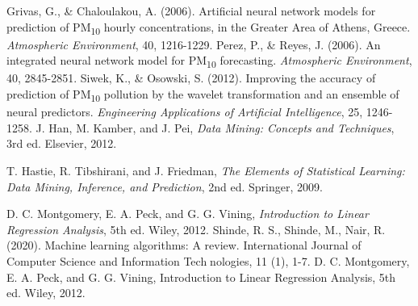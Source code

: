 \documentclass{book}
\numberwithin{equation}{section}
\numberwithin{figure}{section}
\begin{document}
\begin{thebibliography}{99}
    Grivas, G., \& Chaloulakou, A. (2006). Artificial neural network models for prediction of PM\textsubscript{10} hourly concentrations, in the Greater Area of Athens, Greece. \textit{Atmospheric Environment}, 40, 1216-1229.
    Perez, P., \& Reyes, J. (2006). An integrated neural network model for PM\textsubscript{10} forecasting. \textit{Atmospheric Environment}, 40, 2845-2851.
    Siwek, K., \& Osowski, S. (2012). Improving the accuracy of prediction of PM\textsubscript{10} pollution by the wavelet transformation and an ensemble of neural predictors. \textit{Engineering Applications of Artificial Intelligence}, 25, 1246-1258.
    J. Han, M. Kamber, and J. Pei, \textit{Data Mining: Concepts and Techniques}, 3rd ed. Elsevier, 2012.

    T. Hastie, R. Tibshirani, and J. Friedman, \textit{The Elements of Statistical Learning: Data Mining, Inference, and Prediction}, 2nd ed. Springer, 2009.

    D. C. Montgomery, E. A. Peck, and G. G. Vining, \textit{Introduction to Linear Regression Analysis}, 5th ed. Wiley, 2012.
    Shinde, R. S., Shinde, M., Nair, R. (2020). Machine learning algorithms: A review. International Journal of Computer Science and Information Tech￾nologies, 11 (1), 1-7.
    D. C. Montgomery, E. A. Peck, and G. G. Vining, Introduction to Linear
    Regression Analysis, 5th ed. Wiley, 2012.

\end{thebibliography}
%
%
%
%
\end{document}

